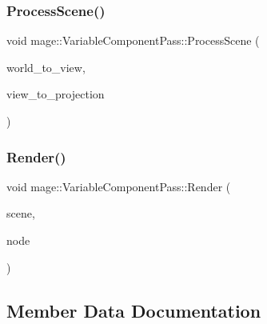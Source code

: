 \hypertarget{classmage_1_1_variable_component_pass_af5b0d4b24912744a7d68111d8b9598ad}{}\label{classmage_1_1_variable_component_pass_af5b0d4b24912744a7d68111d8b9598ad} 
\subsubsection{\texorpdfstring{Process\+Scene()}{ProcessScene()}}
{\footnotesize\ttfamily void mage\+::\+Variable\+Component\+Pass\+::\+Process\+Scene (\begin{DoxyParamCaption}\item[{F\+X\+M\+M\+A\+T\+R\+IX}]{world\+\_\+to\+\_\+view,  }\item[{F\+X\+M\+M\+A\+T\+R\+IX}]{view\+\_\+to\+\_\+projection }\end{DoxyParamCaption})\hspace{0.3cm}{\ttfamily [private]}}

\hypertarget{classmage_1_1_variable_component_pass_a012b74d72c3755b732d21f857f85a246}{}\label{classmage_1_1_variable_component_pass_a012b74d72c3755b732d21f857f85a246} 
\subsubsection{\texorpdfstring{Render()}{Render()}}
{\footnotesize\ttfamily void mage\+::\+Variable\+Component\+Pass\+::\+Render (\begin{DoxyParamCaption}\item[{const \hyperlink{structmage_1_1_pass_buffer}{Pass\+Buffer} $\ast$}]{scene,  }\item[{const \hyperlink{classmage_1_1_camera_node}{Camera\+Node} $\ast$}]{node }\end{DoxyParamCaption})}



\subsection{Member Data Documentation}
\hypertarget{classmage_1_1_variable_component_pass_a5ad5ee6588063683cacf4ad3aac055bc}{}\label{classmage_1_1_variable_component_pass_a5ad5ee6588063683cacf4ad3aac055bc} 
